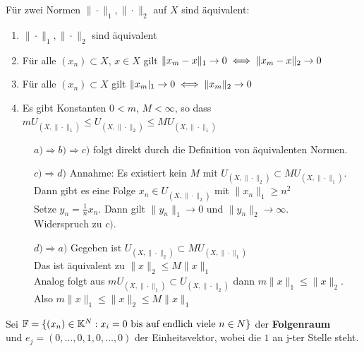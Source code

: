\begin{prop}
	Für zwei Normen $\| \cdot \|_{1}, \| \cdot \|_{2}$ auf $X$ sind äquivalent:
	\begin{enumerate}[label=\alph*\upshape)]
		\item $\| \cdot \|_{1}, \| \cdot \|_{2}$ sind äquivalent
		\item Für alle $(x_{n}) \subset X$, $x \in X$ gilt $\| x_{m} - x \|_{1} \rightarrow 0 \iff \| x_{m} - x \|_{2} \rightarrow 0 $
		\item Für alle $(x_{n}) \subset X$ gilt $\| x_{m} |_{1} \rightarrow 0 \iff \| x_{m} \|_{2} \rightarrow 0 $
		\item Es gibt Konstanten $0 < m$, $M < \infty$, so dass $m U_{(X, \| \cdot \|_{1})} \leq U_{(X, \| \cdot \|_{2})} \leq M U_{(X, \| \cdot \|_{1})}$
	\end{enumerate}
	\begin{beweis}
		\begin{description}
			\item[] $a) \Rightarrow b) \Rightarrow c)$ folgt direkt durch die Definition von äquivalenten Normen. 
  			\item[] $c) \Rightarrow d)$ Annahme: Es existiert kein $M$ mit $U_{(X, \| \cdot \|_{2})} \subset M U_{(X, \| \cdot \|_{1})}$. \\
  				Dann gibt es eine Folge $x_{n} \in U_{(X, \| \cdot \|_{2})}$ mit $\| x_{n} \|_{1} \geq n^{2}$ \\
  				Setze $y_{n} =  \frac{1}{n} x_{n}$. Dann gilt $\| y_{n} \|_{1} \rightarrow 0$ und $\| y_{n} \|_{2} \rightarrow \infty$. \\
  				Widerspruch zu $c)$.
  			 \item[] $d) \Rightarrow a)$ Gegeben ist $U_{(X, \| \cdot \|_{2})} \subset M U_{(X, \| \cdot \|_{1})}$ \\
  			 Das ist äquivalent zu $\| x \|_{2} \leq M \| x \|_{1}$ \\
  			 Analog folgt aus $m U_{(X, \| \cdot \|_{1})} \subset U_{(X, \| \cdot \|_{2})}$ dann $m \| x \|_{1} \leq \| x \|_{2}$. \\
  			 Also $m \| x \|_{1} \leq \| x \|_{2} \leq M \| x \|_{1}$ 
		\end{description}
	\end{beweis}
\end{prop}


\begin{vereinbarung} 
Sei $\mathbb{F} = \{ (x_{n}) \in \mathbb{K}^{N}: x_{i} = 0 \text{ bis auf endlich viele } n \in N  \} $ der \textbf{Folgenraum} \\
und $e_{j} = (0, \dotsc, 0, 1, 0, \dotsc, 0) $ der Einheitsvektor, wobei die $1$ an j-ter Stelle steht.
\end{vereinbarung}

